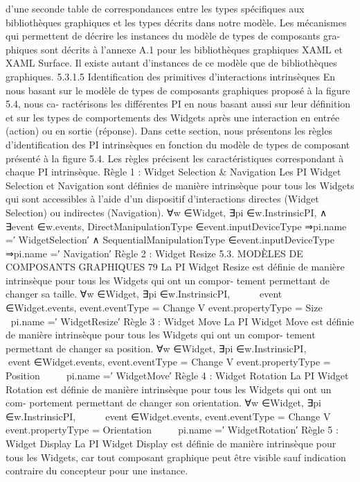 \documentclass{article}
\begin{document}
d’une seconde table de correspondances entre les types spéciﬁques aux bibliothèques graphiques et
les types décrits dans notre modèle.
Les mécanismes qui permettent de décrire les instances du modèle de types de composants gra-
phiques sont décrits à l’annexe A.1 pour les bibliothèques graphiques XAML et XAML Surface. Il
existe autant d’instances de ce modèle que de bibliothèques graphiques.
5.3.1.5
Identiﬁcation des primitives d’interactions intrinsèques
En nous basant sur le modèle de types de composants graphiques proposé à la ﬁgure 5.4, nous ca-
ractérisons les différentes PI en nous basant aussi sur leur déﬁnition et sur les types de comportements
des Widgets après une interaction en entrée (action) ou en sortie (réponse).
Dans cette section, nous présentons les règles d’identiﬁcation des PI intrinsèques en fonction
du modèle de types de composant présenté à la ﬁgure 5.4. Les règles précisent les caractéristiques
correspondant à chaque PI intrinsèque.
Règle 1 : Widget Selection & Navigation
Les PI Widget Selection et Navigation sont déﬁnies de manière intrinsèque pour tous les Widgets
qui sont accessibles à l’aide d’un dispositif d’interactions directes (Widget Selection) ou indirectes
(Navigation).
∀w ∈{Widget}, ∃pi ∈w.InstrinsicPI,
∧
∃event ∈w.events,
DirectManipulationType ∈event.inputDeviceType ⇒pi.name =′ WidgetSelection′
∧
SequentialManipulationType ∈event.inputDeviceType ⇒pi.name =′ Navigation′
Règle 2 : Widget Resize
5.3. MODÈLES DE COMPOSANTS GRAPHIQUES
79
La PI Widget Resize est déﬁnie de manière intrinsèque pour tous les Widgets qui ont un compor-
tement permettant de changer sa taille.
∀w ∈{Widget}, ∃pi ∈w.InstrinsicPI,




∃event ∈Widget.events,
event.eventType = Change
V
event.propertyType = Size



⇒pi.name =′ WidgetResize′
Règle 3 : Widget Move
La PI Widget Move est déﬁnie de manière intrinsèque pour tous les Widgets qui ont un compor-
tement permettant de changer sa position.
∀w ∈{Widget}, ∃pi ∈w.InstrinsicPI,




∃event ∈Widget.events,
event.eventType = Change
V
event.propertyType = Position



⇒pi.name =′ WidgetMove′
Règle 4 : Widget Rotation
La PI Widget Rotation est déﬁnie de manière intrinsèque pour tous les Widgets qui ont un com-
portement permettant de changer son orientation.
∀w ∈{Widget}, ∃pi ∈w.InstrinsicPI,




∃event ∈Widget.events,
event.eventType = Change
V
event.propertyType = Orientation



⇒pi.name =′ WidgetRotation′
Règle 5 : Widget Display
La PI Widget Display est déﬁnie de manière intrinsèque pour tous les Widgets, car tout composant
graphique peut être visible sauf indication contraire du concepteur pour une instance.
\end{document}
